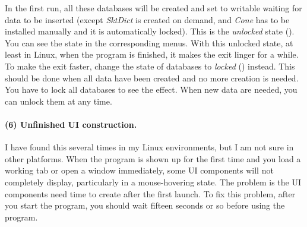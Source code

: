 In the first run, all these databases will be created and set to writable waiting for data to be inserted (except \emph{SktDict} is created on demand, and \emph{Cone} has to be installed manually and it is automatically locked). This is the \emph{unlocked} state ({\faSix {}}). You can see the state in the corresponding menus. With this unlocked state, at least in Linux, when the program is finished, it makes the exit linger for a while. To make the exit faster, change the state of databases to \emph{locked} ({\faSix {}}) instead. This should be done when all data have been created and no more creation is needed. You have to lock all databases to see the effect. When new data are needed, you can unlock them at any time.

\paragraph{(6) Unfinished UI construction.} I have found this several times in my Linux environments, but I am not sure in other platforms. When the program is shown up for the first time and you load a working tab or open a window immediately, some UI components will not completely display, particularly in a mouse-hovering state. The problem is the UI components need time to create after the first launch. To fix this problem, after you start the program, you should wait fifteen seconds or so before using the program.
